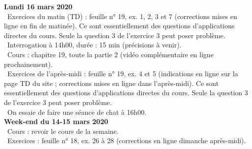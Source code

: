 \documentclass[12pt,a4paper]{article}
\begin{document}
% 
% 
% 

\noindent\textbf{\bf Lundi 16 mars 2020} \\
\bu\ Exercices du matin (TD) : feuille n° 19, ex. 1, 2, 3 et 7 (corrections mises en ligne en fin de matinée). Ce sont essentiellement des questions d'applications directes du cours. Seule la question 3 de l'exercice 3 peut poser problème.\\
\bu\ Interrogation à 14h00, durée : 15 min (précisions à venir).\\
\bu\ Cours : chapitre 19, toute la partie 2 (vidéo complémentaire en ligne prochainement).\\
\bu\ Exercices de l'après-midi : feuille n° 19, ex. 4 et 5 (indications en ligne sur la page TD du site ; corrections mises en ligne dans l'après-midi). Ce sont essentiellement des questions d'applications directes du cours. Seule la question 3 de l'exercice 3 peut poser problème.\\
\bu\ On essaie de faire une séance de chat à 16h00.
\vspace{.4cm}\\

\noindent\textbf{Week-end du 14-15 mars 2020}\\
\bu\ Cours : revoir le cours de la semaine.\\
\bu\ Exercices : feuille n° 18, ex. 26 à 28 (corrections en ligne dimanche après-midi).\vspace{.4cm}\\




\label{end}
\end{document}

